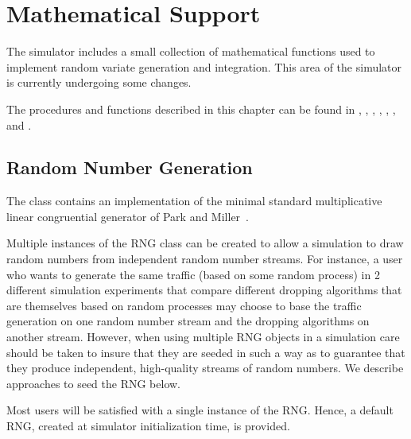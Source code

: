 %
%
\chapter{Mathematical Support}
\label{chap:math}

The simulator includes a small collection of mathematical
functions used to implement random variate generation and integration.
This area of the simulator is currently undergoing some
changes.

The procedures and functions described in this chapter can be found in
,
,
,
,
,
, and
.

\section{Random Number Generation}
\label{sec:random}

The  class contains an implementation of the minimal standard
multiplicative linear congruential generator of
Park and Miller~\cite{Park88:Random}.

Multiple instances of the RNG class can be created to allow a
simulation to draw random numbers from independent random number
streams.  For instance, a user who wants to generate the same traffic
(based on some random process) in 2 different simulation experiments
that compare different dropping algorithms that are themselves based
on random processes may choose to base the traffic generation on one
random number stream and the dropping algorithms on another stream.
However, when using multiple RNG objects in a simulation care should
be taken to insure that they are seeded in such a way as to guarantee
that they produce independent, high-quality streams of random numbers.
We describe approaches to seed the RNG below.

Most users will be satisfied with a single instance of the RNG.
Hence, a default RNG, created at simulator initialization time, is
provided.

